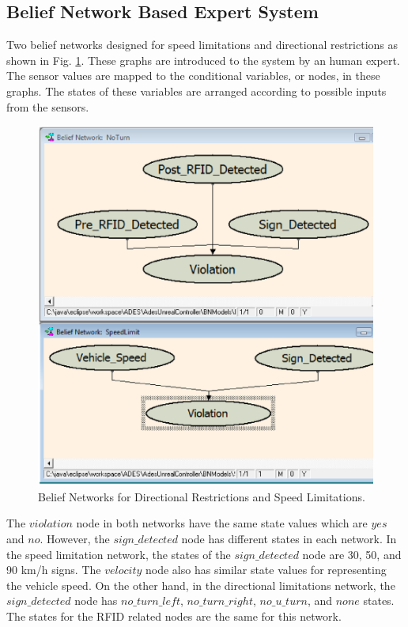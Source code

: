\documentclass[letterpaper, 10 pt, conference]{ieeeconf}
\begin{document}
\subsection{Belief Network Based Expert System}

Two belief networks designed for speed limitations and directional restrictions as shown in Fig. \ref{fig:bn}. These graphs are introduced to the system by an human expert. The sensor values are mapped to the conditional variables, or nodes, in these graphs. The states of these variables are arranged according to possible inputs from the sensors.

\begin{figure}[thb]
      \centering
      \includegraphics[scale=0.3]{img/bn}
      \caption{Belief Networks for Directional Restrictions and Speed Limitations.}
      \label{fig:bn}
\end{figure}

The $violation$ node in both networks have the same state values which are $yes$ and $no$. However, the $sign\_detected$ node has different states in each network. In the speed limitation network, the states of the $sign\_detected$ node are 30, 50, and 90 km/h signs. The $velocity$ node also has similar state values for representing the vehicle speed. On the other hand, in the directional limitations network, the $sign\_detected$ node has $no\_turn\_left$, $no\_turn\_right$, $no\_u\_turn$, and $none$ states. The states for the RFID related nodes are the same for this network.
\end{document}
